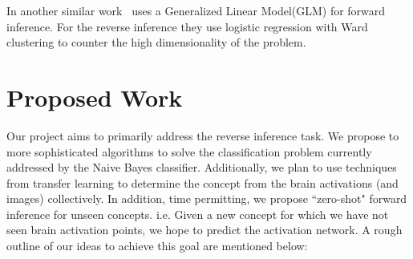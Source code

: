 \documentclass[11pt]{article}
\begin{document}
In another similar work~\cite{schwartz2013mapping} uses a Generalized Linear Model(GLM) for forward inference. For the reverse inference they use logistic regression with Ward clustering to counter the high dimensionality of the problem. 





\section{Proposed Work}

Our project aims to primarily address the reverse inference task. We propose to more sophisticated algorithms to solve the classification problem currently addressed by the Naive Bayes classifier. Additionally, we plan to use techniques from transfer learning to determine the concept from the brain activations (and images) collectively. In addition, time permitting, we propose ``zero-shot" forward inference for unseen concepts. i.e. Given a new concept for which we have not seen brain activation points, we hope to predict the activation network. A rough outline of our ideas to achieve this goal are mentioned below:
\end{document}
